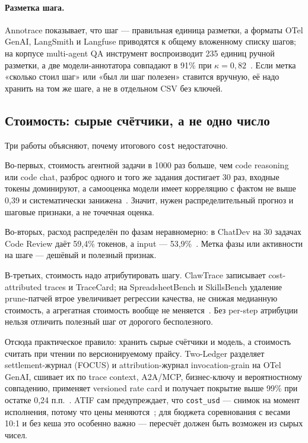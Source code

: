 \documentclass[11pt,a4paper]{article}
\begin{document}
\paragraph{Разметка шага.}
Annotrace показывает, что шаг — правильная единица разметки, а форматы
OTel GenAI, LangSmith и Langfuse приводятся к общему вложенному списку
шагов; на корпусе multi-agent QA инструмент воспроизводит 235 единиц
ручной разметки, а две модели-аннотатора совпадают в 91\% при
$\kappa=0{,}82$~\cite{huang2026annotrace}. Если метка «сколько стоил шаг»
или «был ли шаг полезен» ставится вручную, её надо хранить на том же шаге,
а не в отдельном CSV без ключей.

\subsection{Стоимость: сырые счётчики, а не одно число}

Три работы объясняют, почему итогового \texttt{cost} недостаточно.

Во-первых, стоимость агентной задачи в 1000 раз больше, чем code reasoning
или code chat, разброс одного и того же задания достигает 30 раз, входные
токены доминируют, а самооценка модели имеет корреляцию с фактом не выше
0,39 и систематически занижена~\cite{bai2026money}. Значит, нужен
распределительный прогноз и шаговые признаки, а не точечная оценка.

Во-вторых, расход распределён по фазам неравномерно: в ChatDev на 30
задачах Code Review даёт 59,4\% токенов, а input — 53,9\%~\cite{salim2026tokenomics}.
Метка фазы или активности на шаге — дешёвый и полезный признак.

В-третьих, стоимость надо атрибутировать шагу. ClawTrace записывает
cost-attributed traces и TraceCard; на SpreadsheetBench и SkillsBench
удаление prune-патчей втрое увеличивает регрессии качества, не снижая
медианную стоимость, а агрегатная стоимость вообще не меняется~\cite{yuan2026clawtrace}.
Без per-step атрибуции нельзя отличить полезный шаг от дорогого
бесполезного.

Отсюда практическое правило: хранить сырые счётчики и модель, а стоимость
считать при чтении по версионируемому прайсу. Two-Ledger разделяет
settlement-журнал (FOCUS) и attribution-журнал invocation-grain на OTel
GenAI, сшивает их по trace context, A2A/MCP, бизнес-ключу и вероятностному
совпадению, применяет versioned rate card и получает покрытие выше 99\%
при остатке 0,24 п.п.~\cite{acharya2026twoledger}. ATIF сам предупреждает,
что \texttt{cost\_usd} — снимок на момент исполнения, потому что цены
меняются~\cite{atif2026}; для бюджета соревнования с весами 10:1 и без
кеша это особенно важно — пересчёт должен быть возможен из сырых чисел.
\end{document}
